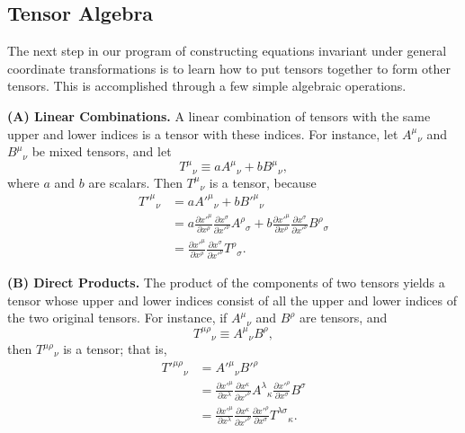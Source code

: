 
\subsection{Tensor Algebra}\label{sec:4.3}

The next step in our program of constructing equations invariant under general
coordinate transformations is to learn how to put tensors together to form
other tensors. This is accomplished through a few simple algebraic operations.

\medskip
\noindent\textbf{(A) Linear Combinations.}
A linear combination of tensors with the same upper and lower indices is a
tensor with these indices. For instance, let \(A^\mu{}_\nu\) and
\(B^\mu{}_\nu\) be mixed tensors, and let
\[
  T^\mu{}_\nu\equiv aA^\mu{}_\nu+bB^\mu{}_\nu,
\]
where \(a\) and \(b\) are scalars. Then \(T^\mu{}_\nu\) is a tensor, because
\begin{align*}
  T'^\mu{}_\nu
  &=aA'^\mu{}_\nu+bB'^\mu{}_\nu
  \\
  &=
  a\frac{\partial x'^\mu}{\partial x^\rho}
   \frac{\partial x^\sigma}{\partial x'^\nu}A^\rho{}_\sigma
  +b\frac{\partial x'^\mu}{\partial x^\rho}
   \frac{\partial x^\sigma}{\partial x'^\nu}B^\rho{}_\sigma
  \\
  &=
  \frac{\partial x'^\mu}{\partial x^\rho}
  \frac{\partial x^\sigma}{\partial x'^\nu}T^\rho{}_\sigma.
\end{align*}

\medskip
\noindent\textbf{(B) Direct Products.}
The product of the components of two tensors yields a tensor whose upper and
lower indices consist of all the upper and lower indices of the two original
tensors. For instance, if \(A^\mu{}_\nu\) and \(B^\rho\) are tensors, and
\[
  T^{\mu\rho}{}_\nu\equiv A^\mu{}_\nu B^\rho,
\]
then \(T^{\mu\rho}{}_\nu\) is a tensor; that is,
\begin{align*}
  T'^{\mu\rho}{}_\nu
  &=A'^\mu{}_\nu B'^\rho
  \\
  &=
  \frac{\partial x'^\mu}{\partial x^\lambda}
  \frac{\partial x^\kappa}{\partial x'^\nu}A^\lambda{}_\kappa
  \frac{\partial x'^\rho}{\partial x^\sigma}B^\sigma
  \\
  &=
  \frac{\partial x'^\mu}{\partial x^\lambda}
  \frac{\partial x^\kappa}{\partial x'^\nu}
  \frac{\partial x'^\rho}{\partial x^\sigma}
  T^{\lambda\sigma}{}_\kappa.
\end{align*}

